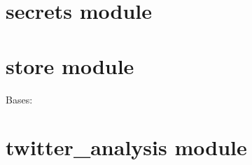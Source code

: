 \documentclass[letterpaper,10pt,english]{sphinxmanual}
\begin{document}
\chapter{secrets module}
\label{secrets:module-secrets}\label{secrets::doc}\label{secrets:secrets-module}

\chapter{store module}
\label{store:store-module}\label{store:module-store}\label{store::doc}

\begin{fulllineitems}
\label{store:store.StoreType}
Bases: 

\end{fulllineitems}


\begin{fulllineitems}
\label{store:store.get_search_tweets}
\end{fulllineitems}


\begin{fulllineitems}
\label{store:store.read}
\end{fulllineitems}


\begin{fulllineitems}
\label{store:store.save}
\end{fulllineitems}



\chapter{twitter\_analysis module}
\label{twitter_analysis:module-twitter_analysis}\label{twitter_analysis:twitter-analysis-module}\label{twitter_analysis::doc}
\end{document}
